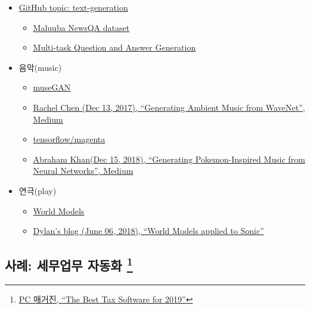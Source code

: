 \documentclass[smallextended]{svjour3}       %
\providecommand{\tightlist}{%
  \setlength{\itemsep}{0pt}\setlength{\parskip}{0pt}}
\begin{document}
\begin{itemize}
\tightlist
\item
  \href{https://github.com/topics/text-generation}{GitHub topic:
  text-generation}

  \begin{itemize}
  \tightlist
  \item
    \href{https://github.com/Maluuba/newsqa}{Maluuba NewsQA dataset}
  \item
    \href{https://github.com/Maluuba/qgen-workshop}{Multi-task Question
    and Answer Generation}
  \end{itemize}
\item
  음악(music)

  \begin{itemize}
  \tightlist
  \item
    \href{https://salu133445.github.io/musegan/}{museGAN}
  \item
    \href{https://medium.com/@rachelchen_49210/generating-ambient-noise-from-wavenet-95aa7f0a8f77}{Rachel
    Chen (Dec 13, 2017), ``Generating Ambient Music from WaveNet'',
    Medium}
  \item
    \href{https://github.com/tensorflow/magenta}{tensorflow/magenta}
  \item
    \href{https://towardsdatascience.com/generating-pokemon-inspired-music-from-neural-networks-bc240014132}{Abraham
    Khan(Dec 15, 2018), ``Generating Pokemon-Inspired Music from Neural
    Networks'', Medium}
  \end{itemize}
\item
  연극(play)

  \begin{itemize}
  \tightlist
  \item
    \href{https://worldmodels.github.io/}{World Models}
  \item
    \href{https://dylandjian.github.io/world-models/}{Dylan's blog (June
    06, 2018), ``World Models applied to Sonic''}
  \end{itemize}
\end{itemize}

\hypertarget{sec:1}{%
\subsection[사례: 세무업무 자동화 ]{\texorpdfstring{사례: 세무업무
자동화 \footnote{\href{https://www.pcmag.com/roundup/167894/the-best-tax-software}{PC
  매거진, ``The Best Tax Software for 2019''}}}{사례: 세무업무 자동화 }}\label{sec:1}}
\end{document}
